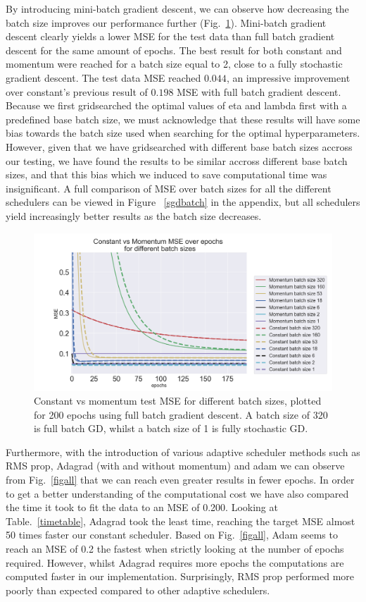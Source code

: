 \documentclass[onecolumn,10pt,cleanfoot]{asme2ej}
\begin{document}
By introducing mini-batch gradient descent, we can observe how decreasing the batch size improves our performance further (Fig.~\ref{batch_constant_v_momentum}). Mini-batch gradient descent clearly yields a lower MSE for the test data than full batch gradient descent for the same amount of epochs. The best result for both constant and momentum were reached for a batch size equal to 2, close to a fully stochastic gradient descent. The test data MSE reached $0.044$, an impressive improvement over constant's previous result of $0.198$ MSE with full batch gradient descent. Because we first gridsearched the optimal values of eta and lambda first with a predefined base batch size, we must acknowledge that these results will have some bias towards the batch size used when searching for the optimal hyperparameters. However, given that we have gridsearched with different base batch sizes accross our testing, we have found the results to be similar accross different base batch sizes, and that this bias which we induced to save computational time was insignificant. A full comparison of MSE over batch sizes for all the different schedulers can be viewed in Figure ~\ref{sgdbatch} in the appendix, but all schedulers yield increasingly better results as the batch size decreases.

\begin{figure}[H]
\centerline{\includegraphics[width=6in]{figure/SGD_batch_momentum_constant.png}}
\caption{Constant vs momentum test MSE for different batch sizes, plotted for 200 epochs using full batch gradient descent. A batch size of 320 is full batch GD, whilst a batch size of 1 is fully stochastic GD.}
\label{batch_constant_v_momentum}
\end{figure}

Furthermore, with the introduction of various adaptive scheduler methods such as RMS prop, Adagrad (with and without momentum) and adam we can observe from Fig.~\ref{figall} that we can reach even greater results in fewer epochs. In order to get a better understanding of the computational cost we have also compared the time it took to fit the data to an MSE of 0.200. Looking at Table.~\ref{timetable}, Adagrad took the least time, reaching the target MSE almost 50 times faster our constant scheduler. Based on Fig.~\ref{figall}, Adam seems to reach an MSE of 0.2 the fastest when strictly looking at the number of epochs required. However, whilst Adagrad requires more epochs the computations are computed faster in our implementation. Surprisingly, RMS prop performed more poorly than expected compared to other adaptive schedulers.
\end{document}
